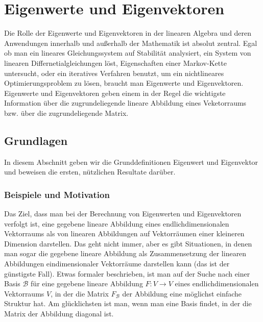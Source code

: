 
\section{Eigenwerte und Eigenvektoren}

Die Rolle der Eigenwerte und Eigenvektoren in der linearen Algebra und deren Anwendungen innerhalb und außerhalb der Mathematik ist absolut zentral. Egal ob man ein lineares Gleichungssystem auf Stabilität analysiert, ein System von linearen Differnetialgleichungen löst, Eigenschaften einer Markov-Kette untersucht, oder ein iteratives Verfahren benutzt, um ein nichtlineares Optimierungsproblem zu lösen, braucht man Eigenwerte und Eigenvektoren. Eigenwerte und Eigenvektoren geben einem in der Regel die wichtigste Information über die zugrundeliegende lineare Abbildung eines Veketorraums bzw. über die zugrundeliegende Matrix. 

\subsection{Grundlagen}

In diesem Abschnitt geben wir die Grunddefinitionen Eigenwert und Eigenvektor und beweisen die ersten, nützlichen Resultate darüber.

\subsubsection{Beispiele und Motivation}\label{motiv:eigenwerte}

Das Ziel, dass man bei der Berechnung von Eigenwerten und Eigenvektoren verfolgt ist, eine gegebene lineare Abbildung eines endlichdimensionalen Vektorraums als  von linearen Abbildungen auf Vektorräumen einer kleineren Dimension darstellen. 
Das geht nicht immer, aber es gibt Situationen, in denen man sogar die gegebene lineare Abbildung als Zusammensetzung der linearen Abbildungen eindimensionaler Vektorräume darstellen kann (das ist der günstigste Fall). Etwas formaler beschrieben, ist man auf der Suche nach einer Basis $\mathcal{B}$ für eine gegebene lineare Abbildung $F: V \to V$ eines endlichdimensionalen Vektorraums $V$, in der die Matrix $F_{\mathcal{B}}$ der Abbildung eine möglichst einfache Struktur hat. Am glücklichsten ist man, wenn man eine Basis findet, in der die Matrix der Abbildung diagonal ist. 


